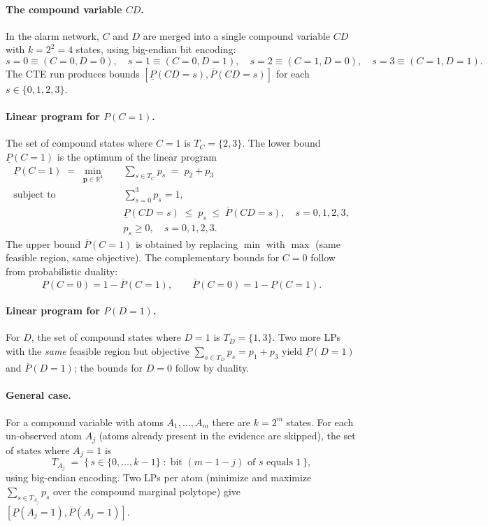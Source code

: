 \documentclass[11pt]{article}
\begin{document}
\paragraph{The compound variable $CD$.}
In the alarm network, $C$ and $D$ are merged into a single compound variable
$CD$ with $k = 2^2 = 4$ states, using big-endian bit encoding:
\[
  s{=}0 \equiv (C{=}0, D{=}0), \quad
  s{=}1 \equiv (C{=}0, D{=}1), \quad
  s{=}2 \equiv (C{=}1, D{=}0), \quad
  s{=}3 \equiv (C{=}1, D{=}1).
\]
The CTE run produces bounds $[\underline{P}(CD{=}s), \overline{P}(CD{=}s)]$ for
each $s \in \{0, 1, 2, 3\}$.

\paragraph{Linear program for $P(C{=}1)$.}
The set of compound states where $C{=}1$ is $T_C = \{2, 3\}$. The lower bound
$\underline{P}(C{=}1)$ is the optimum of the linear program
\[
\begin{aligned}
  \underline{P}(C{=}1) \;=\; \min_{\mathbf{p} \in \mathbb{R}^4} \quad
    & \sum_{s \in T_C} p_s \;=\; p_2 + p_3 \\
  \text{subject to} \quad
    & \sum_{s=0}^{3} p_s = 1, \\
    & \underline{P}(CD{=}s) \;\le\; p_s \;\le\; \overline{P}(CD{=}s),
      \quad s = 0, 1, 2, 3, \\
    & p_s \ge 0, \quad s = 0, 1, 2, 3.
\end{aligned}
\]
The upper bound $\overline{P}(C{=}1)$ is obtained by replacing $\min$ with $\max$
(same feasible region, same objective). The complementary bounds for $C{=}0$
follow from probabilistic duality:
\[
  \underline{P}(C{=}0) = 1 - \overline{P}(C{=}1), \qquad
  \overline{P}(C{=}0) = 1 - \underline{P}(C{=}1).
\]

\paragraph{Linear program for $P(D{=}1)$.}
For $D$, the set of compound states where $D{=}1$ is $T_D = \{1, 3\}$. Two more
LPs with the \emph{same} feasible region but objective $\sum_{s \in T_D} p_s =
p_1 + p_3$ yield $\underline{P}(D{=}1)$ and $\overline{P}(D{=}1)$; the bounds
for $D{=}0$ follow by duality.

\paragraph{General case.}
For a compound variable with atoms $A_1, \ldots, A_m$ there are $k = 2^m$
states. For each un-observed atom $A_j$ (atoms already present in the evidence
are skipped), the set of states where $A_j{=}1$ is
\[
  T_{A_j} \;=\; \bigl\{\, s \in \{0, \ldots, k-1\} \;:\;
                \text{bit } (m{-}1{-}j) \text{ of } s \text{ equals } 1 \,\bigr\},
\]
using big-endian encoding. Two LPs per atom (minimize and maximize
$\sum_{s \in T_{A_j}} p_s$ over the compound marginal polytope) give
$[\underline{P}(A_j{=}1), \overline{P}(A_j{=}1)]$.
\end{document}
